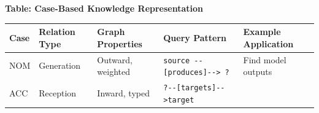 \documentclass[
  11pt,
  letterpaper,
]{article}
\begin{document}
\textbf{Table: Case-Based Knowledge Representation}

\begin{longtable}[]{@{}lllll@{}}
\toprule
\begin{minipage}[b]{0.07\columnwidth}\raggedright
Case\strut
\end{minipage} & \begin{minipage}[b]{0.16\columnwidth}\raggedright
Relation Type\strut
\end{minipage} & \begin{minipage}[b]{0.21\columnwidth}\raggedright
Graph Properties\strut
\end{minipage} & \begin{minipage}[b]{0.16\columnwidth}\raggedright
Query Pattern\strut
\end{minipage} & \begin{minipage}[b]{0.25\columnwidth}\raggedright
Example Application\strut
\end{minipage}\tabularnewline
\midrule
\endhead
\begin{minipage}[t]{0.07\columnwidth}\raggedright
NOM\strut
\end{minipage} & \begin{minipage}[t]{0.16\columnwidth}\raggedright
Generation\strut
\end{minipage} & \begin{minipage}[t]{0.21\columnwidth}\raggedright
Outward, weighted\strut
\end{minipage} & \begin{minipage}[t]{0.16\columnwidth}\raggedright
\texttt{source\ -\/-{[}produces{]}-\/-\textgreater{}\ ?}\strut
\end{minipage} & \begin{minipage}[t]{0.25\columnwidth}\raggedright
Find model outputs\strut
\end{minipage}\tabularnewline
\begin{minipage}[t]{0.07\columnwidth}\raggedright
ACC\strut
\end{minipage} & \begin{minipage}[t]{0.16\columnwidth}\raggedright
Reception\strut
\end{minipage} & \begin{minipage}[t]{0.21\columnwidth}\raggedright
Inward, typed\strut
\end{minipage} & \begin{minipage}[t]{0.16\columnwidth}\raggedright
\texttt{?-\/-{[}targets{]}-\/-\textgreater{}target}\strut
\end{minipage} & \begin{minipage}[t]{0.25\columnwidth}\raggedright

\end{minipage}
\end{longtable}
\end{document}
